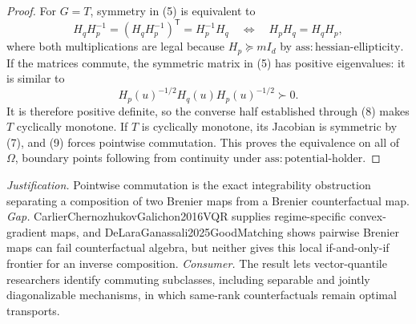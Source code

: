 \documentclass{article}
\begin{document}
\begin{proof}
For \(G=T\), symmetry in (5) is equivalent to
\[
 H_qH_p^{-1}=(H_qH_p^{-1})^{\mathsf T}=H_p^{-1}H_q
 \quad\Longleftrightarrow\quad
 H_pH_q=H_qH_p,
 \tag{9}
\]
where both multiplications are legal because \(H_p\succeq mI_d\) by \(\mathrm{ass:hessian\text{-}ellipticity}\).  If the matrices commute, the symmetric matrix in (5) has positive eigenvalues: it is similar to
\[
 H_p(u)^{-1/2}H_q(u)H_p(u)^{-1/2}\succ0.
\]
It is therefore positive definite, so the converse half established through (8) makes \(T\) cyclically monotone.  If \(T\) is cyclically monotone, its Jacobian is symmetric by (7), and (9) forces pointwise commutation.  This proves the equivalence on all of \(\Omega\), boundary points following from continuity under \(\mathrm{ass:potential\text{-}holder}\).
\end{proof}
\par\smallskip\noindent \textit{Justification.} Pointwise commutation is the exact integrability obstruction separating a composition of two Brenier maps from a Brenier counterfactual map. \textit{Gap.} CarlierChernozhukovGalichon2016VQR supplies regime-specific convex-gradient maps, and DeLaraGanassali2025GoodMatching shows pairwise Brenier maps can fail counterfactual algebra, but neither gives this local if-and-only-if frontier for an inverse composition. \textit{Consumer.} The result lets vector-quantile researchers identify commuting subclasses, including separable and jointly diagonalizable mechanisms, in which same-rank counterfactuals remain optimal transports.
\end{document}
